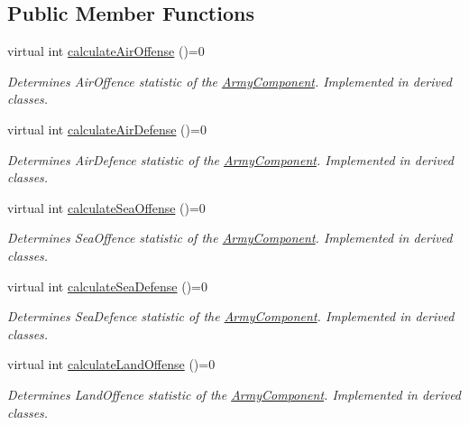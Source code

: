 \subsection*{Public Member Functions}
\begin{DoxyCompactItemize}
\item 
virtual int \mbox{\hyperlink{class_army_component_aeea4bed9a4850e9b74f9306a8443085c}{calculate\+Air\+Offense}} ()=0
\begin{DoxyCompactList}\small\item\em Determines Air\+Offence statistic of the \mbox{\hyperlink{class_army_component}{Army\+Component}}. Implemented in derived classes. \end{DoxyCompactList}\item 
virtual int \mbox{\hyperlink{class_army_component_a9f6671dd8cd4037722f592f0fa86e3a2}{calculate\+Air\+Defense}} ()=0
\begin{DoxyCompactList}\small\item\em Determines Air\+Defence statistic of the \mbox{\hyperlink{class_army_component}{Army\+Component}}. Implemented in derived classes. \end{DoxyCompactList}\item 
virtual int \mbox{\hyperlink{class_army_component_a6e29f65ac92c18a82bf4a6a06d6d4457}{calculate\+Sea\+Offense}} ()=0
\begin{DoxyCompactList}\small\item\em Determines Sea\+Offence statistic of the \mbox{\hyperlink{class_army_component}{Army\+Component}}. Implemented in derived classes. \end{DoxyCompactList}\item 
virtual int \mbox{\hyperlink{class_army_component_af5656dd9c12738ec90ea7886fd7ee34a}{calculate\+Sea\+Defense}} ()=0
\begin{DoxyCompactList}\small\item\em Determines Sea\+Defence statistic of the \mbox{\hyperlink{class_army_component}{Army\+Component}}. Implemented in derived classes. \end{DoxyCompactList}\item 
virtual int \mbox{\hyperlink{class_army_component_a0556ff6dbfa956f9ab52aadaa6a331e1}{calculate\+Land\+Offense}} ()=0
\begin{DoxyCompactList}\small\item\em Determines Land\+Offence statistic of the \mbox{\hyperlink{class_army_component}{Army\+Component}}. Implemented in derived classes. \end{DoxyCompactList}\item 

\end{DoxyCompactItemize}
